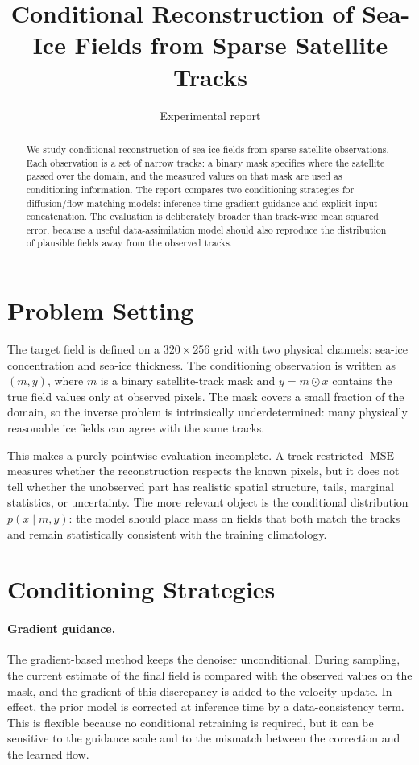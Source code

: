 \documentclass[10pt,a4paper]{article}
\title{\vspace{-1.2em}\bfseries Conditional Reconstruction of Sea-Ice Fields from Sparse Satellite Tracks}
\author{\small Experimental report}
\date{\vspace{-1.0em}}
\newcommand{\mse}{\operatorname{MSE}}
\begin{document}
\maketitle

\begin{abstract}
We study conditional reconstruction of sea-ice fields from sparse satellite observations. Each observation is a set of narrow tracks: a binary mask specifies where the satellite passed over the domain, and the measured values on that mask are used as conditioning information. The report compares two conditioning strategies for diffusion/flow-matching models: inference-time gradient guidance and explicit input concatenation. The evaluation is deliberately broader than track-wise mean squared error, because a useful data-assimilation model should also reproduce the distribution of plausible fields away from the observed tracks.
\end{abstract}

\section{Problem Setting}

The target field is defined on a $320\times256$ grid with two physical channels: sea-ice concentration and sea-ice thickness. The conditioning observation is written as $(m,y)$, where $m$ is a binary satellite-track mask and $y=m\odot x$ contains the true field values only at observed pixels. The mask covers a small fraction of the domain, so the inverse problem is intrinsically underdetermined: many physically reasonable ice fields can agree with the same tracks.

This makes a purely pointwise evaluation incomplete. A track-restricted $\mse$ measures whether the reconstruction respects the known pixels, but it does not tell whether the unobserved part has realistic spatial structure, tails, marginal statistics, or uncertainty. The more relevant object is the conditional distribution $p(x\mid m,y)$: the model should place mass on fields that both match the tracks and remain statistically consistent with the training climatology.

\section{Conditioning Strategies}

\paragraph{Gradient guidance.}
The gradient-based method keeps the denoiser unconditional. During sampling, the current estimate of the final field is compared with the observed values on the mask, and the gradient of this discrepancy is added to the velocity update. In effect, the prior model is corrected at inference time by a data-consistency term. This is flexible because no conditional retraining is required, but it can be sensitive to the guidance scale and to the mismatch between the correction and the learned flow.
\end{document}
